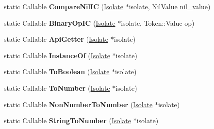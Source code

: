\begin{DoxyCompactItemize}
\item 
static Callable {\bfseries Compare\+Nil\+IC} (\hyperlink{classv8_1_1internal_1_1_isolate}{Isolate} $\ast$isolate, Nil\+Value nil\+\_\+value)\hypertarget{classv8_1_1internal_1_1_code_factory_aeabd532bd22481106347e9692404c3ed}{}\label{classv8_1_1internal_1_1_code_factory_aeabd532bd22481106347e9692404c3ed}

\item 
static Callable {\bfseries Binary\+Op\+IC} (\hyperlink{classv8_1_1internal_1_1_isolate}{Isolate} $\ast$isolate, Token\+::\+Value op)\hypertarget{classv8_1_1internal_1_1_code_factory_a1b6367bf28755be4b08ca7c9391bece1}{}\label{classv8_1_1internal_1_1_code_factory_a1b6367bf28755be4b08ca7c9391bece1}

\item 
static Callable {\bfseries Api\+Getter} (\hyperlink{classv8_1_1internal_1_1_isolate}{Isolate} $\ast$isolate)\hypertarget{classv8_1_1internal_1_1_code_factory_a47b9d57a1647b6c92f15639ca6ba4223}{}\label{classv8_1_1internal_1_1_code_factory_a47b9d57a1647b6c92f15639ca6ba4223}

\item 
static Callable {\bfseries Instance\+Of} (\hyperlink{classv8_1_1internal_1_1_isolate}{Isolate} $\ast$isolate)\hypertarget{classv8_1_1internal_1_1_code_factory_a35c5bfd2ba8c832ee81e500907a0fcc6}{}\label{classv8_1_1internal_1_1_code_factory_a35c5bfd2ba8c832ee81e500907a0fcc6}

\item 
static Callable {\bfseries To\+Boolean} (\hyperlink{classv8_1_1internal_1_1_isolate}{Isolate} $\ast$isolate)\hypertarget{classv8_1_1internal_1_1_code_factory_a4d4ef990a4495d9fa90418e79cdb60f6}{}\label{classv8_1_1internal_1_1_code_factory_a4d4ef990a4495d9fa90418e79cdb60f6}

\item 
static Callable {\bfseries To\+Number} (\hyperlink{classv8_1_1internal_1_1_isolate}{Isolate} $\ast$isolate)\hypertarget{classv8_1_1internal_1_1_code_factory_a29072d5b1113a0c64f71f97c1cd17982}{}\label{classv8_1_1internal_1_1_code_factory_a29072d5b1113a0c64f71f97c1cd17982}

\item 
static Callable {\bfseries Non\+Number\+To\+Number} (\hyperlink{classv8_1_1internal_1_1_isolate}{Isolate} $\ast$isolate)\hypertarget{classv8_1_1internal_1_1_code_factory_aee2e9ce55328f206d225da3ecb2450ab}{}\label{classv8_1_1internal_1_1_code_factory_aee2e9ce55328f206d225da3ecb2450ab}

\item 
static Callable {\bfseries String\+To\+Number} (\hyperlink{classv8_1_1internal_1_1_isolate}{Isolate} $\ast$isolate)\hypertarget{classv8_1_1internal_1_1_code_factory_a48f4dfd628433840c27e2bd74f50656d}{}\label{classv8_1_1internal_1_1_code_factory_a48f4dfd628433840c27e2bd74f50656d}


\end{DoxyCompactItemize}
